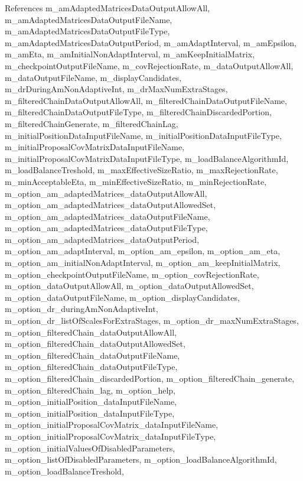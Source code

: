 References m\-\_\-am\-Adapted\-Matrices\-Data\-Output\-Allow\-All, m\-\_\-am\-Adapted\-Matrices\-Data\-Output\-File\-Name, m\-\_\-am\-Adapted\-Matrices\-Data\-Output\-File\-Type, m\-\_\-am\-Adapted\-Matrices\-Data\-Output\-Period, m\-\_\-am\-Adapt\-Interval, m\-\_\-am\-Epsilon, m\-\_\-am\-Eta, m\-\_\-am\-Initial\-Non\-Adapt\-Interval, m\-\_\-am\-Keep\-Initial\-Matrix, m\-\_\-checkpoint\-Output\-File\-Name, m\-\_\-cov\-Rejection\-Rate, m\-\_\-data\-Output\-Allow\-All, m\-\_\-data\-Output\-File\-Name, m\-\_\-display\-Candidates, m\-\_\-dr\-During\-Am\-Non\-Adaptive\-Int, m\-\_\-dr\-Max\-Num\-Extra\-Stages, m\-\_\-filtered\-Chain\-Data\-Output\-Allow\-All, m\-\_\-filtered\-Chain\-Data\-Output\-File\-Name, m\-\_\-filtered\-Chain\-Data\-Output\-File\-Type, m\-\_\-filtered\-Chain\-Discarded\-Portion, m\-\_\-filtered\-Chain\-Generate, m\-\_\-filtered\-Chain\-Lag, m\-\_\-initial\-Position\-Data\-Input\-File\-Name, m\-\_\-initial\-Position\-Data\-Input\-File\-Type, m\-\_\-initial\-Proposal\-Cov\-Matrix\-Data\-Input\-File\-Name, m\-\_\-initial\-Proposal\-Cov\-Matrix\-Data\-Input\-File\-Type, m\-\_\-load\-Balance\-Algorithm\-Id, m\-\_\-load\-Balance\-Treshold, m\-\_\-max\-Effective\-Size\-Ratio, m\-\_\-max\-Rejection\-Rate, m\-\_\-min\-Acceptable\-Eta, m\-\_\-min\-Effective\-Size\-Ratio, m\-\_\-min\-Rejection\-Rate, m\-\_\-option\-\_\-am\-\_\-adapted\-Matrices\-\_\-data\-Output\-Allow\-All, m\-\_\-option\-\_\-am\-\_\-adapted\-Matrices\-\_\-data\-Output\-Allowed\-Set, m\-\_\-option\-\_\-am\-\_\-adapted\-Matrices\-\_\-data\-Output\-File\-Name, m\-\_\-option\-\_\-am\-\_\-adapted\-Matrices\-\_\-data\-Output\-File\-Type, m\-\_\-option\-\_\-am\-\_\-adapted\-Matrices\-\_\-data\-Output\-Period, m\-\_\-option\-\_\-am\-\_\-adapt\-Interval, m\-\_\-option\-\_\-am\-\_\-epsilon, m\-\_\-option\-\_\-am\-\_\-eta, m\-\_\-option\-\_\-am\-\_\-initial\-Non\-Adapt\-Interval, m\-\_\-option\-\_\-am\-\_\-keep\-Initial\-Matrix, m\-\_\-option\-\_\-checkpoint\-Output\-File\-Name, m\-\_\-option\-\_\-cov\-Rejection\-Rate, m\-\_\-option\-\_\-data\-Output\-Allow\-All, m\-\_\-option\-\_\-data\-Output\-Allowed\-Set, m\-\_\-option\-\_\-data\-Output\-File\-Name, m\-\_\-option\-\_\-display\-Candidates, m\-\_\-option\-\_\-dr\-\_\-during\-Am\-Non\-Adaptive\-Int, m\-\_\-option\-\_\-dr\-\_\-list\-Of\-Scales\-For\-Extra\-Stages, m\-\_\-option\-\_\-dr\-\_\-max\-Num\-Extra\-Stages, m\-\_\-option\-\_\-filtered\-Chain\-\_\-data\-Output\-Allow\-All, m\-\_\-option\-\_\-filtered\-Chain\-\_\-data\-Output\-Allowed\-Set, m\-\_\-option\-\_\-filtered\-Chain\-\_\-data\-Output\-File\-Name, m\-\_\-option\-\_\-filtered\-Chain\-\_\-data\-Output\-File\-Type, m\-\_\-option\-\_\-filtered\-Chain\-\_\-discarded\-Portion, m\-\_\-option\-\_\-filtered\-Chain\-\_\-generate, m\-\_\-option\-\_\-filtered\-Chain\-\_\-lag, m\-\_\-option\-\_\-help, m\-\_\-option\-\_\-initial\-Position\-\_\-data\-Input\-File\-Name, m\-\_\-option\-\_\-initial\-Position\-\_\-data\-Input\-File\-Type, m\-\_\-option\-\_\-initial\-Proposal\-Cov\-Matrix\-\_\-data\-Input\-File\-Name, m\-\_\-option\-\_\-initial\-Proposal\-Cov\-Matrix\-\_\-data\-Input\-File\-Type, m\-\_\-option\-\_\-initial\-Values\-Of\-Disabled\-Parameters, m\-\_\-option\-\_\-list\-Of\-Disabled\-Parameters, m\-\_\-option\-\_\-load\-Balance\-Algorithm\-Id, m\-\_\-option\-\_\-load\-Balance\-Treshold, 